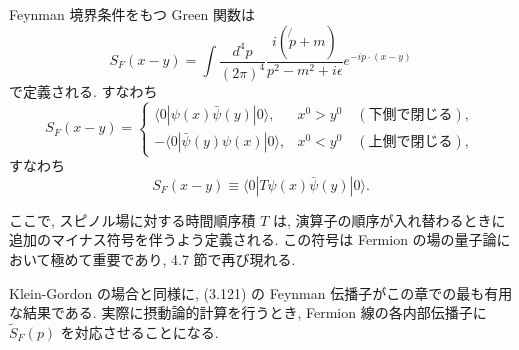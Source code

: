 \documentclass[a4paper,12pt]{article}
\begin{document}
Feynman 境界条件をもつ Green 関数は
\begin{equation}
S_F(x-y) = \int \frac{d^4p}{(2\pi)^4} \frac{i(\not{p}+m)}{p^2-m^2+i\epsilon} e^{-ip\cdot(x-y)}
\end{equation}
で定義される. すなわち
\begin{equation}
S_F(x-y) =
\begin{cases}
\langle 0|\psi(x)\bar{\psi}(y)|0\rangle, & x^0>y^0 \quad (\text{下側で閉じる}) , \\
-\langle 0|\bar{\psi}(y)\psi(x)|0\rangle, & x^0<y^0 \quad (\text{上側で閉じる}) ,
\end{cases}
\end{equation}
すなわち
\begin{equation}
S_F(x-y) \equiv \langle 0| T\psi(x)\bar{\psi}(y)|0\rangle.
\tag{3.121}
\end{equation}

ここで, スピノル場に対する時間順序積 $T$ は, 演算子の順序が入れ替わるときに追加のマイナス符号を伴うよう定義される.  
この符号は Fermion の場の量子論において極めて重要であり, 4.7 節で再び現れる.  

Klein-Gordon の場合と同様に, (3.121) の Feynman 伝播子がこの章での最も有用な結果である.  
実際に摂動論的計算を行うとき, Fermion 線の各内部伝播子に $\tilde{S}_F(p)$ を対応させることになる.
\end{document}
